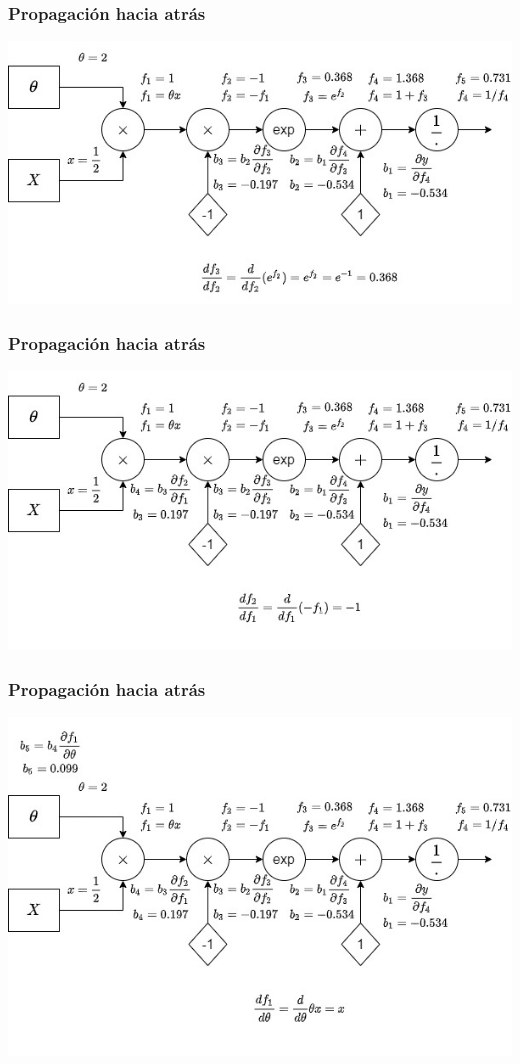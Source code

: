 \documentclass{beamer}
\begin{document}
\begin{frame}
\frametitle{Propagación hacia atrás}
\includegraphics[scale=0.4]{im5}
\end{frame}
\begin{frame}
\frametitle{Propagación hacia atrás}
\includegraphics[scale=0.4]{im6}
\end{frame}
\begin{frame}
\frametitle{Propagación hacia atrás}
\includegraphics[scale=0.4]{im7}
\end{frame}
\end{document}
